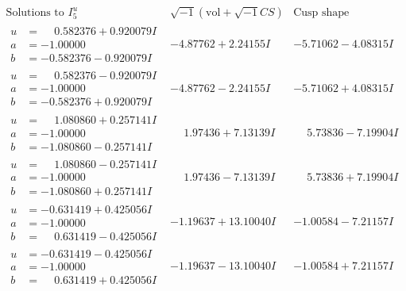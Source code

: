 \documentclass[1p]{elsarticle_modified}
\theoremstyle{definition}
\newcommand{\I}{\sqrt{-1}}
\begin{document}
$$\begin{array}{c|c|c}  
\text{Solutions to }I^u_{5}& \I (\text{vol} + \sqrt{-1}CS) & \text{Cusp shape}\\
 \hline 
\begin{aligned}
u &= \phantom{-}0.582376 + 0.920079 I \\
a &= -1.00000\phantom{ +0.000000I} \\
b &= -0.582376 - 0.920079 I\end{aligned}
 & -4.87762 + 2.24155 I & -5.71062 - 4.08315 I \\ \hline\begin{aligned}
u &= \phantom{-}0.582376 - 0.920079 I \\
a &= -1.00000\phantom{ +0.000000I} \\
b &= -0.582376 + 0.920079 I\end{aligned}
 & -4.87762 - 2.24155 I & -5.71062 + 4.08315 I \\ \hline\begin{aligned}
u &= \phantom{-}1.080860 + 0.257141 I \\
a &= -1.00000\phantom{ +0.000000I} \\
b &= -1.080860 - 0.257141 I\end{aligned}
 & \phantom{-}1.97436 + 7.13139 I & \phantom{-}5.73836 - 7.19904 I \\ \hline\begin{aligned}
u &= \phantom{-}1.080860 - 0.257141 I \\
a &= -1.00000\phantom{ +0.000000I} \\
b &= -1.080860 + 0.257141 I\end{aligned}
 & \phantom{-}1.97436 - 7.13139 I & \phantom{-}5.73836 + 7.19904 I \\ \hline\begin{aligned}
u &= -0.631419 + 0.425056 I \\
a &= -1.00000\phantom{ +0.000000I} \\
b &= \phantom{-}0.631419 - 0.425056 I\end{aligned}
 & -1.19637 + 13.10040 I & -1.00584 - 7.21157 I \\ \hline\begin{aligned}
u &= -0.631419 - 0.425056 I \\
a &= -1.00000\phantom{ +0.000000I} \\
b &= \phantom{-}0.631419 + 0.425056 I\end{aligned}
 & -1.19637 - 13.10040 I & -1.00584 + 7.21157 I \\ \hline\begin{aligned}

\end{aligned}
\end{array}$$
\end{document}
